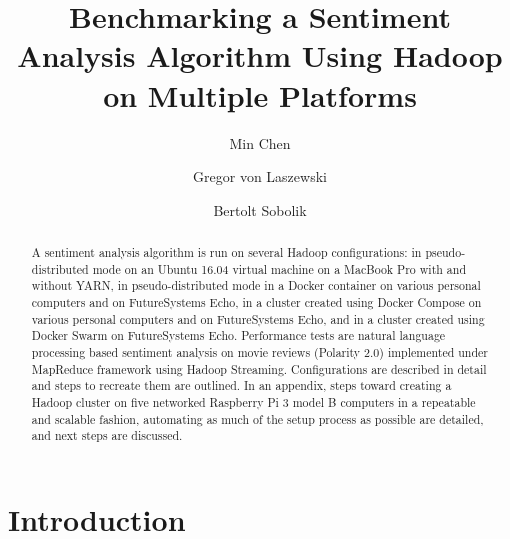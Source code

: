 \title{Benchmarking a Sentiment Analysis Algorithm Using Hadoop on Multiple 
Platforms}


\author{Min Chen}

\author{Gregor von Laszewski}

\author{Bertolt Sobolik}


\renewcommand{\shortauthors}{M. Chen, G. v. Laszewski, B. Sobolik}


\begin{abstract}
A sentiment analysis algorithm is run on several Hadoop
configurations: in pseudo-distributed mode on an Ubuntu 16.04 virtual
machine on a MacBook Pro with and without YARN, in pseudo-distributed
mode in a Docker container on various personal computers and on
FutureSystems Echo, in a cluster created using Docker Compose on
various personal computers and on FutureSystems Echo, and in a cluster
created using Docker Swarm on FutureSystems Echo. Performance tests
are natural language processing based sentiment analysis on movie
reviews (Polarity 2.0) implemented under MapReduce framework using
Hadoop Streaming. Configurations are described in detail and steps to
recreate them are outlined. In an appendix, steps toward creating a
Hadoop cluster on five networked Raspberry Pi 3 model B computers in a
repeatable and scalable fashion, automating as much of the setup
process as possible are detailed, and next steps are discussed.
\end{abstract}



\maketitle

\section{Introduction}\label{s:intro}


